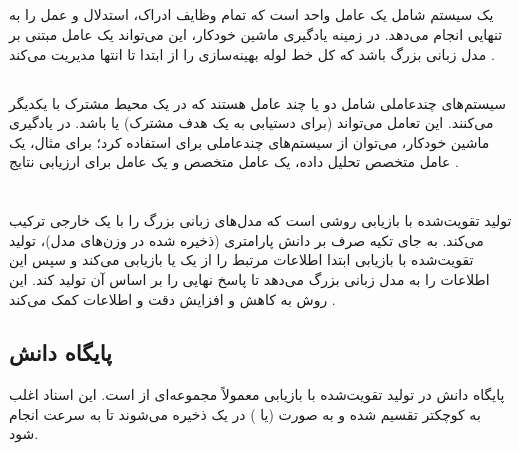 \subsection[تک‌عاملی]{}
یک سیستم  شامل یک عامل واحد است که تمام وظایف ادراک، استدلال و عمل را به تنهایی انجام می‌دهد. در زمینه یادگیری ماشین خودکار، این می‌تواند یک عامل مبتنی بر مدل زبانی بزرگ باشد که کل خط لوله بهینه‌سازی را از ابتدا تا انتها مدیریت می‌کند \cite{wang2024survey}.

\subsection[چندعاملی]{}
سیستم‌های چندعاملی شامل دو یا چند عامل هستند که در یک محیط مشترک با یکدیگر  می‌کنند. این تعامل می‌تواند  (برای دستیابی به یک هدف مشترک) یا  باشد. در یادگیری ماشین خودکار، می‌توان از سیستم‌های چندعاملی برای  استفاده کرد؛ برای مثال، یک عامل متخصص تحلیل داده، یک عامل متخصص  و یک عامل  برای ارزیابی نتایج \cite{wang2024survey}.

\section[تولید تقویت‌شده با بازیابی]{}
تولید تقویت‌شده با بازیابی \cite{Lewis2020RAG} روشی است که مدل‌های زبانی بزرگ را با یک  خارجی ترکیب می‌کند. به جای تکیه صرف بر دانش پارامتری (ذخیره شده در وزن‌های مدل)، تولید تقویت‌شده با بازیابی ابتدا اطلاعات مرتبط را از یک  یا  بازیابی می‌کند و سپس این اطلاعات را به مدل زبانی بزرگ می‌دهد تا پاسخ نهایی را بر اساس آن تولید کند. این روش به کاهش  و افزایش دقت و  اطلاعات کمک می‌کند \cite{xia2025ragselfreasoning}.

\subsection{پایگاه دانش}
پایگاه دانش در تولید تقویت‌شده با بازیابی معمولاً مجموعه‌ای از  است. این اسناد اغلب به  کوچکتر تقسیم شده و به صورت  (یا ) در یک  ذخیره می‌شوند تا  به سرعت انجام شود.

